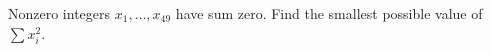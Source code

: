 Nonzero integers $x_1,\ldots,x_{49}$ have sum zero. Find the smallest possible value of $\sum x_i^2$.
